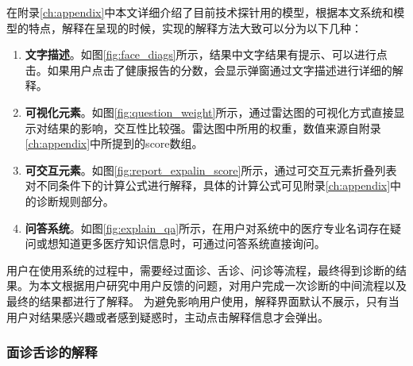 在附录\ref{ch:appendix}中本文详细介绍了目前技术探针用的模型，根据本文系统和模型的特点，解释在呈现的时候，实现的解释方法大致可以分为以下几种：
\begin{enumerate}
    \item \textbf{文字描述}。如图\ref{fig:face_diags}所示，结果中文字结果有提示、可以进行点击。如果用户点击了健康报告的分数，会显示弹窗通过文字描述进行详细的解释。

    \item \textbf{可视化元素}。如图\ref{fig:question_weight}所示，通过雷达图的可视化方式直接显示对结果的影响，交互性比较强。雷达图中所用的权重，数值来源自附录\ref{ch:appendix}中所提到的score数组。
    
    \item \textbf{可交互元素}。如图\ref{fig:report_expalin_score}所示，通过可交互元素折叠列表对不同条件下的计算公式进行解释，具体的计算公式可见附录\ref{ch:appendix}中的诊断规则部分。

    \item \textbf{问答系统}。如图\ref{fig:explain_qa}所示，在用户对系统中的医疗专业名词存在疑问或想知道更多医疗知识信息时，可通过问答系统直接询问。
\end{enumerate}

用户在使用系统的过程中，需要经过面诊、舌诊、问诊等流程，最终得到诊断的结果。为本文根据用户研究中用户反馈的问题，对用户完成一次诊断的中间流程以及最终的结果都进行了解释。
为避免影响用户使用，解释界面默认不展示，只有当用户对结果感兴趣或者感到疑惑时，主动点击解释信息才会弹出。

\subsubsection{面诊舌诊的解释}

